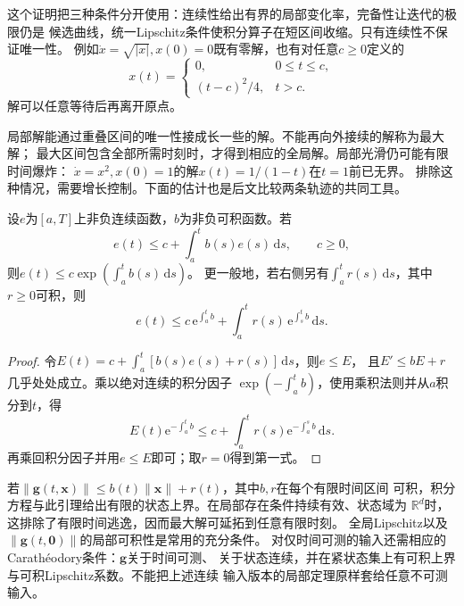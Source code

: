 这个证明把三种条件分开使用：连续性给出有界的局部变化率，完备性让迭代的极限仍是
候选曲线，统一Lipschitz条件使积分算子在短区间收缩。只有连续性不保证唯一性。
例如$\dot x=\sqrt{|x|},x(0)=0$既有零解，也有对任意$c\geq0$定义的
\[
  x(t)=
  \begin{cases}
    0,&0\leq t\leq c,\\
    (t-c)^2/4,&t>c.
  \end{cases}
\]
解可以任意等待后再离开原点。

局部解能通过重叠区间的唯一性接成长一些的解。不能再向外接续的解称为最大解；
最大区间包含全部所需时刻时，才得到相应的全局解。局部光滑仍可能有限时间爆炸：
$\dot x=x^2,x(0)=1$的解$x(t)=1/(1-t)$在$t=1$前已无界。
排除这种情况，需要增长控制。下面的估计也是后文比较两条轨迹的共同工具。

\begin{lemma}[Grönwall积分估计]
  \label{lem:action-state-gronwall}
  设$e$为$[a,T]$上非负连续函数，$b$为非负可积函数。若
  \[
    e(t)\leq c+\int_a^t b(s)e(s)\,\mathrm ds,\qquad c\geq0,
  \]
  则$e(t)\leq c\exp(\int_a^t b(s)\,\mathrm ds)$。
  更一般地，若右侧另有$\int_a^t r(s)\,\mathrm ds$，其中$r\geq0$可积，则
  \[
    e(t)\leq c\,\mathrm e^{\int_a^t b}
      +\int_a^t r(s)\,\mathrm e^{\int_s^t b}\,\mathrm ds.
  \]
\end{lemma}
\begin{proof}
  令$E(t)=c+\int_a^t[b(s)e(s)+r(s)]\,\mathrm ds$，则$e\leq E$，
  且$E'\leq bE+r$几乎处处成立。乘以绝对连续的积分因子
  $\exp(-\int_a^t b)$，使用乘积法则并从$a$积分到$t$，得
  \[
    E(t)\mathrm e^{-\int_a^t b}
    \leq c+\int_a^t r(s)\mathrm e^{-\int_a^s b}\,\mathrm ds.
  \]
  再乘回积分因子并用$e\leq E$即可；取$r=0$得到第一式。
\end{proof}

若$\|\bm g(t,\bm x)\|\leq b(t)\|\bm x\|+r(t)$，其中$b,r$在每个有限时间区间
可积，积分方程与此引理给出有限的状态上界。在局部存在条件持续有效、状态域为
$\mathbb R^d$时，这排除了有限时间逃逸，因而最大解可延拓到任意有限时刻。
全局Lipschitz以及$\|\bm g(t,\bm0)\|$的局部可积性是常用的充分条件。
对仅时间可测的输入还需相应的Carathéodory条件：$\bm g$关于时间可测、
关于状态连续，并在紧状态集上有可积上界与可积Lipschitz系数。不能把上述连续
输入版本的局部定理原样套给任意不可测输入。

